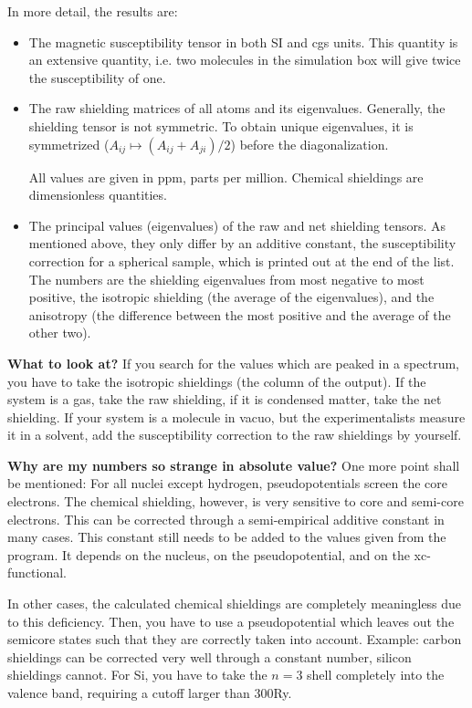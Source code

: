 \documentclass[twoside,10pt,titlepage,a4paper]{article}
\begin{document}
In more detail, the results are:


\begin{itemize}
\item
The magnetic susceptibility tensor in both SI and cgs units. This
quantity is an extensive quantity, i.e. two molecules in the
simulation box will give twice the susceptibility of one.


\item
The raw shielding matrices of all atoms and its eigenvalues. Generally,
the shielding tensor is not symmetric. To obtain unique eigenvalues, it is
symmetrized ($A_{ij} \mapsto (A_{ij}+A_{ji})/2$) before the
diagonalization.

All values are given in ppm, parts per million. Chemical shieldings are
dimensionless quantities.


\item
The principal values (eigenvalues) of the raw and net shielding
tensors. As mentioned above, they only differ by an additive constant,
the susceptibility correction for a spherical sample, which is printed
out at the end of the list. The numbers are the shielding eigenvalues from
most negative to most positive, the isotropic shielding (the average of
the eigenvalues), and the anisotropy (the difference between the most
positive and the average of the other two).

\end{itemize}



\textbf{What to look at?}
If you search for the values which are peaked in a spectrum, you have
to take the isotropic shieldings (the {} column of the
output). If the system is a gas, take the raw shielding, if it is
condensed matter, take the net shielding. If your system is a molecule in
vacuo, but the experimentalists measure it in a solvent, add the
susceptibility correction to the raw shieldings by yourself.

\textbf{Why are my numbers so strange in absolute value?}
One more point shall be mentioned: For all nuclei except hydrogen,
pseudopotentials screen the core electrons. The chemical shielding,
however, is very sensitive to core and semi-core electrons. This can
be corrected through a semi-empirical additive constant in many
cases. This constant still needs to be added to the values given from
the program. It depends on the nucleus, on the pseudopotential, and on
the xc-functional.

In other cases, the calculated chemical shieldings are completely
meaningless due to this deficiency. Then, you have to use a
pseudopotential which leaves out the semicore states such that they
are correctly taken into account. Example: carbon shieldings can be
corrected very well through a constant number, silicon shieldings
cannot. For Si, you have to take the $n=3$ shell completely into the
valence band, requiring a cutoff larger than 300Ry.
\end{document}
